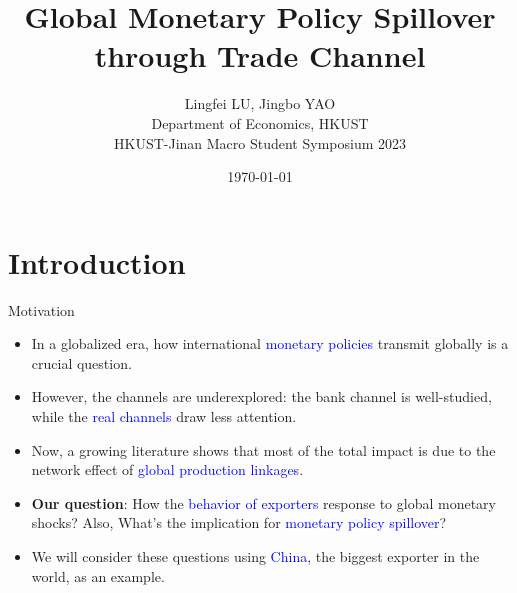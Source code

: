 \documentclass[10pt]{beamer}
\title[Monetary Policy Spillover through Trade Channel]{Global Monetary Policy Spillover through Trade Channel}
\author[Lu\&Yao (2023)]{\large Lingfei LU, Jingbo YAO \\ \vspace{0.5cm} Department of Economics, HKUST \\ \vspace{0.5cm} HKUST-Jinan Macro Student Symposium 2023}
\date{\today}
\begin{document}
	
    \begin{frame}[plain]
	\maketitle {}
    \end{frame}


\section{Introduction}

\begin{frame}{Motivation}



\begin{itemize}
\item In a globalized era, how international \textcolor{blue}{monetary policies} transmit globally is a crucial question.
\item However, the channels are underexplored: the bank channel is well-studied, while the \textcolor{blue}{real channels} draw less attention. 
\item Now, a growing literature shows that most of the total impact is due to the network effect of \textcolor{blue}{global production linkages}.
\item \textbf{Our question}: How the \textcolor{blue}{behavior of exporters} response to global monetary shocks? Also, What's the implication for \textcolor{blue}{monetary policy spillover}?
\item We will consider these questions using \textcolor{blue}{China}, the biggest exporter in the world, as an example. 
\end{itemize}

\end{frame}
\end{document}

